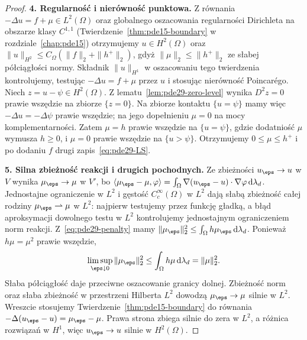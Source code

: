\begin{proof}
\textbf{4. Regularność i nierówność punktowa.}
Z równania $-\Delta u=f+\mu\in L^2(\Omega)$ oraz
globalnego oszacowania regularności Dirichleta na obszarze
klasy $C^{1,1}$ (Twierdzenie~\ref{thm:pde15-boundary}
w rozdziale~\ref{chap:pde15}) otrzymujemy
$u\in H^2(\Omega)$ oraz
$\|u\|_{H^2}\le C_\Omega(\|f\|_2+\|h^+\|_2)$,
gdyż $\|\mu\|_2\le\|h^+\|_2$ ze słabej
półciągłości normy. Składnik $\|u\|_{H^1}$
w oszacowaniu tego twierdzenia kontrolujemy,
testując $-\Delta u=f+\mu$ przez $u$
i stosując nierówność Poincarégo. Niech $z=u-\psi\in H^2(\Omega)$.
Z lematu~\ref{lem:pde29-zero-level} wynika
$D^2z=0$ prawie wszędzie na zbiorze $\{z=0\}$.
Na zbiorze kontaktu $\{u=\psi\}$ mamy więc
$-\Delta u=-\Delta\psi$ prawie wszędzie;
na jego dopełnieniu $\mu=0$ na mocy komplementarności.
Zatem $\mu=h$ prawie wszędzie na $\{u=\psi\}$,
gdzie dodatniość $\mu$ wymusza $h\ge0$,
i $\mu=0$ prawie wszędzie na $\{u>\psi\}$.
Otrzymujemy $0\le\mu\le h^+$ i po dodaniu $f$
drugi zapis~\eqref{eq:pde29-LS}.

\textbf{5. Silna zbieżność reakcji i drugich pochodnych.}
Ze zbieżności $u_\eps\to u$ w $V$ wynika
$\mu_\eps\to\mu$ w $V'$, bo
$\langle\mu_\eps-\mu,\varphi\rangle
=\int_\Omega\nabla(u_\eps-u)\cdot\nabla\varphi\,
\mathrm d\lambda_d$.
Jednostajne ograniczenie w $L^2$ i gęstość
$C_c^\infty(\Omega)$ w $L^2$ dają słabą zbieżność
całej rodziny $\mu_\eps\rightharpoonup\mu$ w $L^2$:
najpierw testujemy przez funkcję gładką, a błąd
aproksymacji dowolnego testu w $L^2$ kontrolujemy
jednostajnym ograniczeniem norm reakcji.
Z~\eqref{eq:pde29-penalty} mamy
$\|\mu_\eps\|_2^2\le\int_\Omega h\mu_\eps
\,\mathrm d\lambda_d$.
Ponieważ $h\mu=\mu^2$ prawie wszędzie,
\[
 \limsup_{\eps\downarrow0}\|\mu_\eps\|_2^2
 \le\int_\Omega h\mu\,\mathrm d\lambda_d=\|\mu\|_2^2.
\]
Słaba półciągłość daje przeciwne oszacowanie
granicy dolnej. Zbieżność norm oraz słaba zbieżność
w przestrzeni Hilberta $L^2$ dowodzą
$\mu_\eps\to\mu$ silnie w $L^2$.
Wreszcie stosujemy Twierdzenie~\ref{thm:pde15-boundary}
do równania $-\Delta(u_\eps-u)=\mu_\eps-\mu$.
Prawa strona zbiega silnie do zera w $L^2$,
a różnica rozwiązań w $H^1$, więc
$u_\eps\to u$ silnie w $H^2(\Omega)$.
\end{proof}

